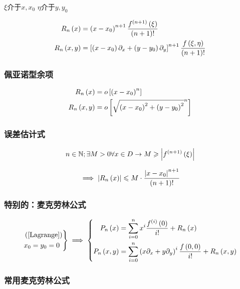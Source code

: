 \documentclass{article}
\begin{document}
$\xi$介于$x,x_0$
$\eta$介于$y,y_0$

\[\begin{aligned}
        R_n\left(x\right)   & =
        \left(x-x_0\right)^{n+1}\frac{f^{\left(n+1\right)}\left(\xi\right)}{\left(n+1\right)!} \\
        R_n\left(x,y\right) & =
        \left[\left(x-x_0\right)\partial_x+\left(y-y_0\right)\partial_y\right]^{n+1}\frac{f\left(\xi,\eta\right)}{\left(n+1\right)!}
    \end{aligned}\]

\subsubsection{佩亚诺型余项}

\[\begin{aligned}
        R_n\left(x\right)   & =
        o\left[\left(x-x_0\right)^n\right] \\
        R_n\left(x,y\right) & =
        o\left[\sqrt{\left(x-x_0\right)^2+\left(y-y_0\right)^2}^n\right]
    \end{aligned}\]

\subsubsection{误差估计式}

\[n\in\mathbb N;\exists M>0\forall x\in D\to M\geqslant\left|f^{\left(n+1\right)}\left(\xi\right)\right|\]

\[\implies\left|R_n\left(x\right)\right|\leqslant M\cdot\frac{\left|x-x_0\right|^{n+1}}{\left(n+1\right)!}\]

\subsubsection{特别的：麦克劳林公式}

\[\left.\begin{aligned}
         & \left(\ref{Lagrange}\right) \\
         & x_0=y_0=0
    \end{aligned}\right\}
    \implies
    \left\{\begin{aligned}
        P_n\left(x\right)   & =\sum_{i=0}^nx^i\frac{f^{\left(i\right)}\left(0\right)}{i!}+R_n\left(x\right)                       \\
        P_n\left(x,y\right) & =\sum_{i=0}^n\left(x\partial_x+y\partial_y\right)^i\frac{f\left(0,0\right)}{i!}+R_n\left(x,y\right)
    \end{aligned}\right.\]

\subsubsection{常用麦克劳林公式}
\end{document}
